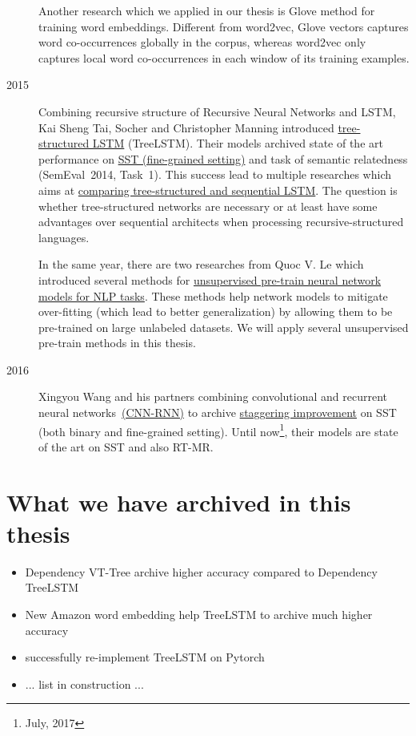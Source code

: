 \begin{description}
Another research which we applied in our thesis is Glove method for training word embeddings\cite{glove}.
Different from word2vec, Glove vectors captures word co-occurrences globally in the corpus, whereas word2vec only captures local word co-occurrences in each window of its training examples\cite{glove}.

\item [2015] Combining recursive structure of Recursive Neural Networks\cite{socher2013recursive} and LSTM\cite{originLSTM}, Kai Sheng Tai, Socher and Christopher Manning introduced \hyperref[sec:treelstm]{tree-structured LSTM}  (TreeLSTM)\cite{treeLSTM}.
Their models archived state of the art performance on \hyperref[sec:sst]{SST (fine-grained setting)} and task of semantic relatedness (SemEval~2014, Task~1\cite{SemeEvalTask1}).
This success lead to multiple researches\cite{need-tree}\cite{bowman-treevslstm}\cite{Graves_Nature2016} which aims at \hyperref[treelstm-advantage]{comparing tree-structured and sequential LSTM}. 
The question is whether tree-structured networks are necessary or at least have some advantages over sequential architects when processing recursive-structured languages\cite{need-tree}\cite{bowman-treevslstm}.   

In the same year, there are two researches\cite{ParagraphVec}\cite{semisup-seq2seq} from Quoc V. Le which introduced several methods for \hyperref[sec:unsupervised-pretrain]{unsupervised pre-train neural network models for NLP tasks}.
These methods help network models to mitigate over-fitting (which lead to better generalization) by allowing them to be pre-trained on large unlabeled datasets.
We will apply several unsupervised pre-train methods in this thesis.

\item [2016] Xingyou Wang and his partners combining convolutional and recurrent neural networks~\hyperref[cnn-rnn]{(CNN-RNN)} to archive \hyperref[table:cnn-rnn]{staggering improvement} on SST (both binary and fine-grained setting).
Until now\footnote{July, 2017}, their models are state of the art on SST and also RT-MR\cite{cnn-rnn}.
\end{description}  

\section{What we have archived in this thesis}
\begin{itemize}
\item Dependency VT-Tree archive higher accuracy compared to Dependency TreeLSTM
\item New Amazon word embedding help TreeLSTM to archive much higher accuracy
\item successfully re-implement TreeLSTM on Pytorch
\item ... list in construction ...
\end{itemize}

